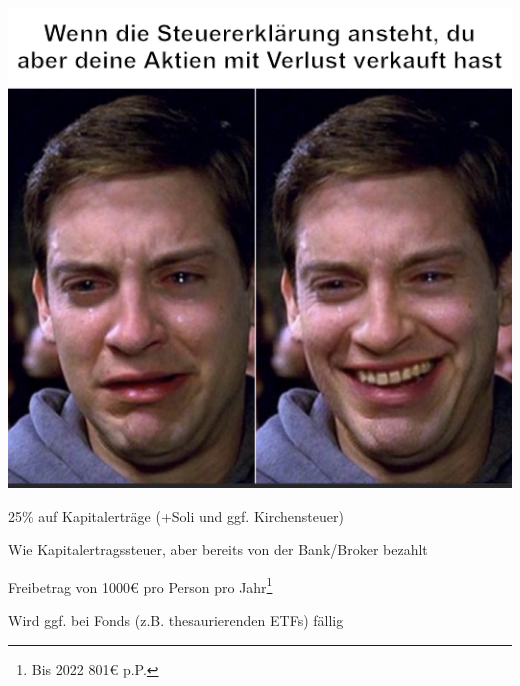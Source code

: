 \documentclass{beamer}
\begin{document}
			\begin{frame}
				\begin{center}
					\vspace{-0.5cm}
					\includegraphics[height=0.85\textheight]{images/taxes-peter-parker}
				\end{center}
			\end{frame}
		
			\begin{frame}
				\begin{description}[labelwidth=0cm,align=right]
					\item[Kapitalertragssteuer] 25\% auf Kapitalerträge (+Soli und ggf. Kirchensteuer)\pause
					\item[Abgeltungssteuer] Wie Kapitalertragssteuer, aber bereits von der Bank/Broker bezahlt\pause
					\item[Sparerpauschbetrag] Freibetrag von 1000€ pro Person pro Jahr\footnote{Bis 2022 801€ p.P.}\pause
					\item[Vorabpauschale] Wird ggf. bei Fonds (z.B. thesaurierenden ETFs) fällig
				\end{description}
			\end{frame}
		
\end{document}
